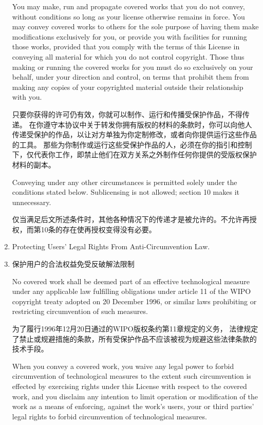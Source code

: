 \documentclass[11pt]{article}
\begin{document}
\begin{enumerate}
You may make, run and propagate covered works that you do not
convey, without conditions so long as your license otherwise remains
in force.  You may convey covered works to others for the sole purpose
of having them make modifications exclusively for you, or provide you
with facilities for running those works, provided that you comply with
the terms of this License in conveying all material for which you do
not control copyright.  Those thus making or running the covered works
for you must do so exclusively on your behalf, under your direction
and control, on terms that prohibit them from making any copies of
your copyrighted material outside their relationship with you.

只要你获得的许可仍有效，你就可以制作、运行和传播受保护作品，不得传递。
在你遵守本协议中关于转发你拥有版权的材料的条款时，你可以向他人传递受保护的作品，以让对方单独为你定制修改，或者向你提供运行这些作品的工具。
那些为你制作或运行这些受保护作品的人，必须在你的指引和控制下，仅代表你工作，即禁止他们在双方关系之外制作任何你提供的受版权保护材料的副本。


Conveying under any other circumstances is permitted solely under
the conditions stated below.  Sublicensing is not allowed; section 10
makes it unnecessary.

仅当满足后文所述条件时，其他各种情况下的传递才是被允许的。不允许再授权，而第10条的存在使再授权变得没有必要。

\item Protecting Users' Legal Rights From Anti-Circumvention Law.
\item 保护用户的合法权益免受反破解法限制

No covered work shall be deemed part of an effective technological
measure under any applicable law fulfilling obligations under article
11 of the WIPO copyright treaty adopted on 20 December 1996, or
similar laws prohibiting or restricting circumvention of such
measures.

为了履行1996年12月20日通过的WIPO版权条约第11章规定的义务，
法律规定了禁止或规避措施的条款，所有受保护作品不应该被视为规避这些法律条款的技术手段。

When you convey a covered work, you waive any legal power to forbid
circumvention of technological measures to the extent such circumvention
is effected by exercising rights under this License with respect to
the covered work, and you disclaim any intention to limit operation or
modification of the work as a means of enforcing, against the work's
users, your or third parties' legal rights to forbid circumvention of
technological measures.


\end{enumerate}
\end{document}
